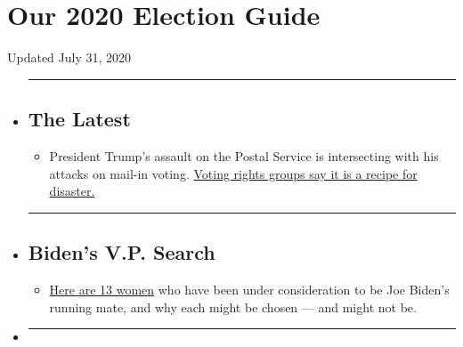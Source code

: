 \hypertarget{our-2020-election-guide}{%
\section{Our 2020 Election Guide}\label{our-2020-election-guide}}

Updated July 31, 2020

\begin{itemize}
\item
  \begin{center}\rule{0.5\linewidth}{\linethickness}\end{center}

  \hypertarget{the-latest}{%
  \subsection{The Latest}\label{the-latest}}

  \begin{itemize}
  \tightlist
  \item
    President Trump's assault on the Postal Service is intersecting with
    his attacks on mail-in voting.
    \href{https://www.nytimes3xbfgragh.onion/2020/07/31/us/politics/trump-usps-mail-delays.html?action=click\&pgtype=Article\&state=default\&region=BELOW_MAIN_CONTENT\&context=storylines_guide}{Voting
    rights groups say it is a recipe for disaster.}
  \end{itemize}
\item
  \begin{center}\rule{0.5\linewidth}{\linethickness}\end{center}

  \hypertarget{bidens-vp-search}{%
  \subsection{Biden's V.P. Search}\label{bidens-vp-search}}

  \begin{itemize}
  \tightlist
  \item
    \href{https://www.nytimes3xbfgragh.onion/article/biden-vice-president-2020.html?action=click\&pgtype=Article\&state=default\&region=BELOW_MAIN_CONTENT\&context=storylines_guide}{Here
    are 13 women} who have been under consideration to be Joe Biden's
    running mate, and why each might be chosen --- and might not be.
  \end{itemize}
\item
  \begin{center}\rule{0.5\linewidth}{\linethickness}\end{center}


\end{itemize}
